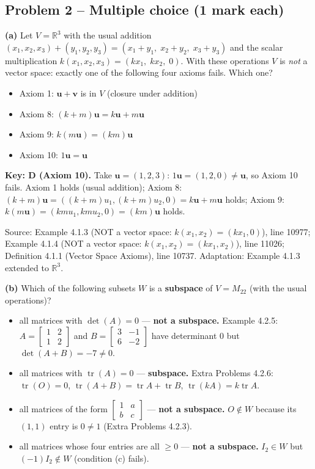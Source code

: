 \documentclass[11pt,a4paper]{article}
\newcommand{\Src}[1]{{\footnotesize\color{black!65}Source: #1}}
\begin{document}
\subsection*{Problem 2 -- Multiple choice (1 mark each)}
\textbf{(a)} Let $V=\mathbb{R}^3$ with the usual addition $(x_1,x_2,x_3)+(y_1,y_2,y_3)=(x_1+y_1,\;x_2+y_2,\;x_3+y_3)$ and the scalar multiplication $k(x_1,x_2,x_3)=(kx_1,\;kx_2,\;0)$. With these operations $V$ is \emph{not} a vector space: exactly one of the following four axioms fails. Which one?\par
\begin{itemize}[leftmargin=8mm,itemsep=0pt]\item[A] Axiom 1: $\mathbf{u}+\mathbf{v}$ is in $V$ (closure under addition)\item[B] Axiom 8: $(k+m)\mathbf{u}=k\mathbf{u}+m\mathbf{u}$\item[C] Axiom 9: $k(m\mathbf{u})=(km)\mathbf{u}$\item[D$^{\ast}$] Axiom 10: $1\mathbf{u}=\mathbf{u}$\end{itemize}
\textbf{Key: D (Axiom 10).} Take $\mathbf{u}=(1,2,3)$: $1\mathbf{u}=(1,2,0)\neq\mathbf{u}$, so Axiom 10 fails. Axiom 1 holds (usual addition); Axiom 8: $(k+m)\mathbf{u}=((k+m)u_1,(k+m)u_2,0)=k\mathbf{u}+m\mathbf{u}$ holds; Axiom 9: $k(m\mathbf{u})=(kmu_1,kmu_2,0)=(km)\mathbf{u}$ holds.\par
\Src{Example 4.1.3 (NOT a vector space: $k(x_1,x_2)=(kx_1,0)$), line 10977; Example 4.1.4 (NOT a vector space: $k(x_1,x_2)=(kx_1,x_2)$), line 11026; Definition 4.1.1 (Vector Space Axioms), line 10737. Adaptation: Example 4.1.3 extended to $\mathbb{R}^3$.}\par
\textbf{(b)} Which of the following subsets $W$ is a \textbf{subspace} of $V=M_{22}$ (with the usual operations)?\par
\begin{itemize}[leftmargin=8mm,itemsep=0pt]\item[A] all matrices with $\det(A)=0$ --- \textbf{not a subspace.} Example 4.2.5: $A=\begin{bmatrix}1&2\\1&2\end{bmatrix}$ and $B=\begin{bmatrix}3&-1\\6&-2\end{bmatrix}$ have determinant $0$ but $\det(A+B)=-7\neq0$.\item[B$^{\ast}$] all matrices with $\operatorname{tr}(A)=0$ --- \textbf{subspace.} Extra Problems 4.2.6: $\operatorname{tr}(O)=0$, $\operatorname{tr}(A+B)=\operatorname{tr}A+\operatorname{tr}B$, $\operatorname{tr}(kA)=k\operatorname{tr}A$.\item[C] all matrices of the form $\begin{bmatrix}1&a\\ b&c\end{bmatrix}$ --- \textbf{not a subspace.} $O\notin W$ because its $(1,1)$ entry is $0\neq1$ (Extra Problems 4.2.3).\item[D] all matrices whose four entries are all $\ge0$ --- \textbf{not a subspace.} $I_2\in W$ but $(-1)I_2\notin W$ (condition (c) fails).\end{itemize}
\end{document}
